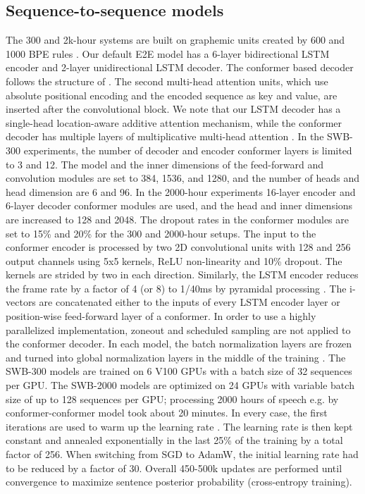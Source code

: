 \documentclass[a4paper]{article}
\begin{document}
\subsection{Sequence-to-sequence models}
\vspace{-1mm}
The 300 and 2k-hour systems are built on graphemic units created by 600 and 1000 BPE rules \cite{subword-nmt}.
Our default E2E model has a 6-layer bidirectional LSTM encoder and 2-layer unidirectional LSTM decoder.
The conformer based decoder follows the structure of \cite{Vaswani2017}.
The second multi-head attention units, which use absolute positional encoding and the encoded sequence as key and value, are inserted after the convolutional block.
We note that our LSTM decoder has a single-head location-aware additive attention mechanism, while the conformer decoder has multiple layers of multiplicative multi-head attention \cite{chorowski15,Gulati2020}.
In the SWB-300 experiments, the number of decoder and encoder conformer layers is limited to 3 and 12.
The model and the inner dimensions of the feed-forward and convolution modules are set to 384, 1536, and 1280, and the number of heads and head dimension are 6 and 96.
In the 2000-hour experiments 16-layer encoder and 6-layer decoder conformer modules are used, and the head and inner dimensions are increased to 128 and 2048.
The dropout rates in the conformer modules are set to 15\% and 20\% for the 300 and 2000-hour setups.
The input to the conformer encoder is processed by two 2D convolutional units with 128 and 256 output channels using 5x5 kernels, ReLU non-linearity and 10\% dropout.
The kernels are strided by two in each direction.
Similarly, the LSTM encoder reduces the frame rate by a factor of 4 (or 8) to 1/40ms by pyramidal processing \cite{Chan2016}.
The i-vectors are concatenated either to the inputs of every LSTM encoder layer or position-wise feed-forward layer of a conformer.
In order to use a highly parallelized implementation, zoneout and scheduled sampling are not applied to the conformer decoder.
In each model, the batch normalization layers are frozen and turned into global normalization layers in the middle of the training \cite{Tuske2020}.
The SWB-300 models are trained on 6 V100 GPUs with a batch size of 32 sequences per GPU.
The SWB-2000 models are optimized on 24 GPUs with variable batch size of up to 128 sequences per GPU; processing 2000 hours of speech e.g. by conformer-conformer model took about 20 minutes.
In every case, the first iterations are used to warm up the learning rate \cite{Goyal2017}.
The learning rate is then kept constant and annealed exponentially in the last 25\% of the training by a total factor of 256.
When switching from SGD to AdamW, the initial learning rate had to be reduced by a factor of 30.
Overall 450-500k updates are performed until convergence to maximize sentence posterior probability (cross-entropy training).
\end{document}
